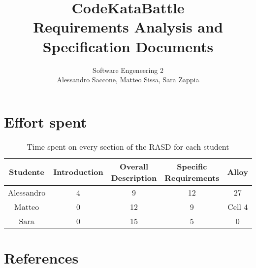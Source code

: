 \documentclass[12pt,a4paper]{article}
\title{CodeKataBattle\\ Requirements Analysis and Specification Documents}
\author{Software Engeneering 2\\
       Alessandro Saccone, Matteo Sissa, Sara Zappia}
\begin{document}
\maketitle

\newpage
\tableofcontents









\section{Effort spent}
\begin{table}[h]
  \centering
  \begin{tabular}{|c|c|c|c|c|}
    \hline
     Studente & Introduction & Overall Description & Specific Requirements & Alloy \\
    \hline
    Alessandro & 4 & 9 & 12 & 27 \\
    \hline
    Matteo & 0 & 12 & 9 & Cell 4 \\
    \hline
    Sara & 0 & 15 & 5 & 0 \\
    \hline
  \end{tabular}
  \caption{Time spent on every section of the RASD for each student}
  \label{tab:effort}
\end{table}

\section{References}
%
%
\end{document}
